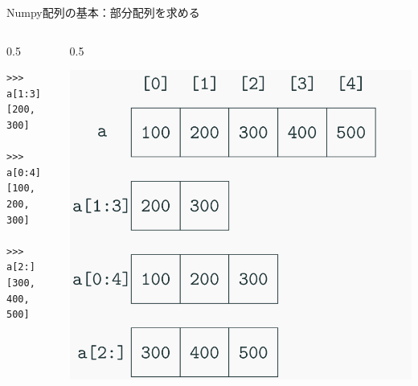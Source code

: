 \documentclass[10pt]{beamer}
\begin{document}
    \begin{frame}[fragile]{Numpy配列の基本：部分配列を求める}
        \begin{columns}
            \begin{column}[c]{0.5\hsize}
                \begin{verbatim}
>>> a[1:3]
[200, 300]

>>> a[0:4]
[100, 200, 300]

>>> a[2:]
[300, 400, 500]
                \end{verbatim}
            \end{column}
            \begin{column}[c]{0.5\hsize}
        	    \begin{center}
        	        \includegraphics[width=\hsize]{figs/numpy2.png}
        	    \end{center}
            \end{column}
        \end{columns}
	\end{frame}
    
\end{document}
